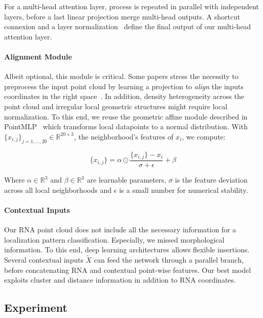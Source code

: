 For a multi-head attention layer, process is repeated in parallel with independent layers, before a last linear projection merge multi-head outputs.
A shortcut connexion and a layer normalization~\cite{ba2016layer} define the final output of our multi-head attention layer.

\paragraph{Alignment Module}

Albeit optional, this module is critical.
Some papers stress the necessity to preprocess the input point cloud by learning a projection to \emph{align} the inputs coordinates in the right space~\cite{Qi_2017_CVPR,Wang_2019}.
In addition, density heterogeneity across the point cloud and irregular local geometric structures might require local normalization.
To this end, we reuse the geometric affine module described in PointMLP~\cite{ma2022rethinking} which transforms local datapoints to a normal distribution.
With $\{x_{i, j}\}_{j=1,\dots,20} \in \mathbb{R}^{20 \times 3}$, the neighborhood's features of $x_i$, we compute:

\begin{equation}
	{\displaystyle \{x_{i, j}\} = \alpha \odot \frac{\{x_{i, j}\} - x_i}{\sigma + \epsilon} + \beta}
\end{equation}

\noindent
Where $\alpha \in \mathbb{R}^3$ and $\beta \in \mathbb{R}^3$ are learnable parameters, $\sigma$ is the feature deviation across all local neighborhoods and $\epsilon$ is a small number for numerical stability.

\paragraph{Contextual Inputs}

Our \ac{RNA} point cloud does not include all the necessary information for a localization pattern classification.
Especially, we missed morphological information.
To this end, deep learning architectures allows flexible insertions.
Several contextual inputs $\tilde{X}$ can feed the network through a parallel branch, before concatenating \ac{RNA} and contextual point-wise features.
Our best model exploits cluster and distance information in addition to \ac{RNA} coordinates.

\subsection{Experiment}
\label{subsec:experiment}

